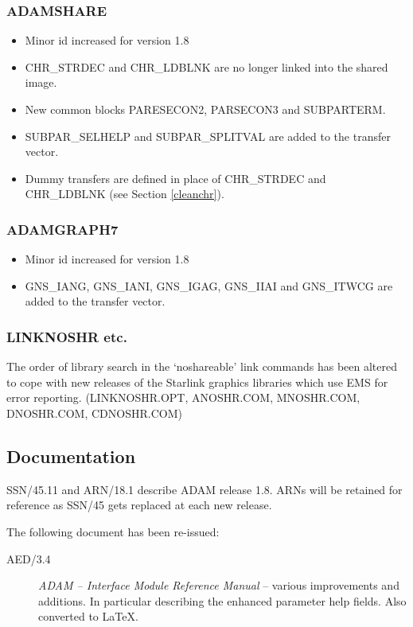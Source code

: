 \subsubsection{ADAMSHARE}
\begin{itemize}
\item Minor id increased for version 1.8
\item CHR\_STRDEC and CHR\_LDBLNK are no longer linked into the shared image.
\item New common blocks PARESECON2, PARSECON3 and SUBPARTERM.
\item SUBPAR\_SELHELP and SUBPAR\_SPLITVAL are added to the transfer vector.
\item Dummy transfers are defined in place of CHR\_STRDEC and CHR\_LDBLNK
(see Section \ref{cleanchr}).
\end{itemize}

\subsubsection{ADAMGRAPH7}
\begin{itemize}
\item Minor id increased for version 1.8
\item GNS\_IANG, GNS\_IANI, GNS\_IGAG, GNS\_IIAI and GNS\_ITWCG are added to 
the transfer vector.
\end{itemize}

\subsubsection{LINKNOSHR etc.}
The order of library search in the `noshareable' link commands has been altered
to cope with new releases of the Starlink graphics libraries which use EMS for
error reporting.
(LINKNOSHR.OPT, ANOSHR.COM, MNOSHR.COM, DNOSHR.COM, CDNOSHR.COM)

\subsection{Documentation}
SSN/45.11 and ARN/18.1 describe ADAM release 1.8.
ARNs will be retained for reference as SSN/45 gets replaced at each new release.

The following document has been re-issued:
\begin{description}
\item[AED/3.4] {\it ADAM -- Interface Module Reference Manual} -- various
improvements and additions. In particular describing the enhanced parameter
help fields. 
Also converted to \LaTeX.
\end{description}

